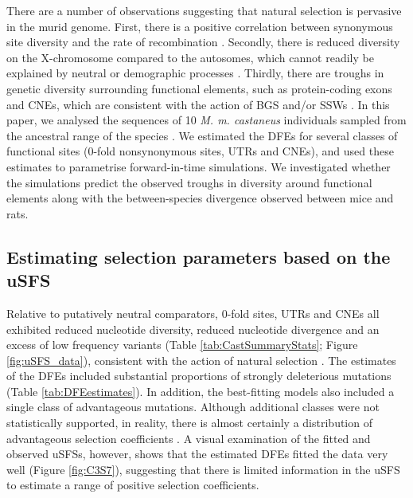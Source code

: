 There are a number of observations suggesting that natural selection is pervasive in the murid genome. First, there is a positive correlation between synonymous site diversity and the rate of recombination \citep{RN340}. Secondly, there is reduced diversity on the X-chromosome compared to the autosomes, which cannot readily be explained by neutral or demographic processes \citep{RN233}. Thirdly, there are troughs in genetic diversity surrounding functional elements, such as protein-coding exons and CNEs, which are consistent with the action of BGS and/or SSWs \citep{RN122}. In this paper, we analysed the sequences of 10 \textit{M. m. castaneus} individuals sampled from the ancestral range of the species \citep{RN122}. We estimated the DFEs for several classes of functional sites (0-fold nonsynonymous sites, UTRs and CNEs), and used these estimates to parametrise forward-in-time simulations. We investigated whether the simulations predict the observed troughs in diversity around functional elements along with the between-species divergence observed between mice and rats.

\subsection{Estimating selection parameters based on the uSFS}

	Relative to putatively neutral comparators, 0-fold sites, UTRs and CNEs all exhibited reduced nucleotide diversity, reduced nucleotide divergence and an excess of low frequency variants (Table \ref{tab:CastSummaryStats}; Figure \ref{fig:uSFS_data}), consistent with the action of natural selection \citep{RN158, RN122}. The estimates of the DFEs included substantial proportions of strongly deleterious mutations (Table \ref{tab:DFEestimates}). In addition, the best-fitting models also included a single class of advantageous mutations. Although additional classes were not statistically supported, in reality, there is almost certainly a distribution of advantageous selection coefficients \citep{RN181, RN345}. A visual examination of the fitted and observed uSFSs, however, shows that the estimated DFEs fitted the data very well (Figure \ref{fig:C3S7}), suggesting that there is limited information in the uSFS to estimate a range of positive selection coefficients. 

